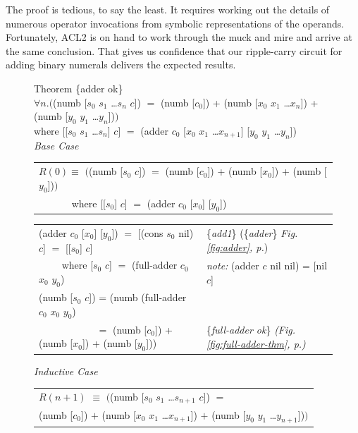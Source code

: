 The proof is tedious, to say the least.
It requires working out the details of
numerous operator invocations
from symbolic representations of the operands.
Fortunately, ACL2 is on hand to work through the
muck and mire and arrive at the same conclusion.
That gives us confidence that our ripple-carry circuit
for adding binary numerals delivers the expected results.

\begin{figure}
Theorem \{adder ok\}\\
$\forall n.($(numb [$s_0$ $s_1$ \dots $s_{n}$ $c$]) $=$
(numb [$c_0$]) + (numb [$x_0$ $x_1$ \dots $x_{n}$]) + (numb [$y_0$ $y_1$ \dots $y_{n}$])$)$\\
\hphantom{numb}where [[$s_0$ $s_1$ \dots $s_{n}$] $c$] $=$ (adder $c_0$ [$x_0$ $x_1$ \dots $x_{n+1}$] [$y_0$ $y_1$ \dots $y_{n}$])\\
\emph{Base Case}
\begin{center}
\begin{tabular}{l}
\hline
$R(0) \equiv$  $($(numb [$s_0$ $c$]) $=$ (numb [$c_0$]) + (numb [$x_0$]) + (numb [$y_0$])$)$ \\
 ~~~~~~ where [[$s_0$] $c$] $=$ (adder $c_0$ [$x_0$] [$y_0$]) \\
\hline
\end{tabular}
\begin{tabular}{ll}
(adder $c_0$ [$x_0$] [$y_0$]) $=$ [(cons $s_0$ nil) $c$] $=$ [[$s_0$] $c$] & \{\emph{add1}\} (\{\emph{adder}\} \emph{Fig. \ref{fig:adder}, p.\pageref{fig:adder}}) \\
~~~~ where [$s_0$ $c$] $=$ (full-adder $c_0$ $x_0$ $y_0$)          & \emph{note:} (adder $c$ nil nil) = [nil $c$] \\
(numb [$s_0$ $c$]) = (numb (full-adder $c_0$ $x_0$ $y_0$)          &  \\
~~~~~~~~~~~ $=$ (numb [$c_0$]) + (numb [$x_0$]) + (numb [$y_0$]))  & \{\emph{full-adder ok}\} \emph{(Fig. \ref{fig:full-adder-thm}, p.\pageref{fig:full-adder-thm})}\\
\end{tabular}
\end{center}
\emph{Inductive Case}
\begin{center}
\begin{tabular}{l}
 \hline
$R(n+1)$ $\equiv$ $($(numb [$s_0$ $s_1$ \dots $s_{n+1}$ $c$]) $=$ \\
\hphantom{$R(n+1)$ $\equiv$ $($}(numb [$c_0$]) $+$ (numb [$x_0$ $x_1$ \dots $x_{n+1}$]) $+$ (numb [$y_0$ $y_1$ \dots $y_{n+1}$])$)$ \\

\end{tabular}
\end{center}
\end{figure}

